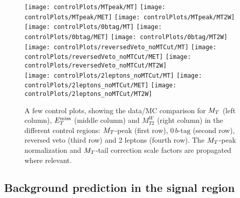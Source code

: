             \begin{figure}[h!]
                \centering
                \texttt{[image: controlPlots/MTpeak/MT]}
                \texttt{[image: controlPlots/MTpeak/MET]}
                \texttt{[image: controlPlots/MTpeak/MT2W]}\\
                \texttt{[image: controlPlots/0btag/MT]}
                \texttt{[image: controlPlots/0btag/MET]}
                \texttt{[image: controlPlots/0btag/MT2W]}\\
                \texttt{[image: controlPlots/reversedVeto\_noMTCut/MT]}
                \texttt{[image: controlPlots/reversedVeto\_noMTCut/MET]}
                \texttt{[image: controlPlots/reversedVeto\_noMTCut/MT2W]}\\
                \texttt{[image: controlPlots/2leptons\_noMTCut/MT]}
                \texttt{[image: controlPlots/2leptons\_noMTCut/MET]}
                \texttt{[image: controlPlots/2leptons\_noMTCut/MT2W]}\\
                \caption{A few control plots, showing the data/MC comparison for $M_T$ (left column),
                        $E_T^\text{miss}$ (middle column) and $M_{T2}^W$ (right column) in the different control
                        regions: $M_T$-peak (first row), $0\, b\text{-tag}$ (second row), reversed veto (third
                        row) and 2 leptons (fourth row). The $M_T$-peak normalization and $M_T$-tail
                        correction scale factors are propagated where relevant.}
                        \label{fig:preselControlPlots}
            \end{figure}

        \subsection{Background prediction in the signal region}

